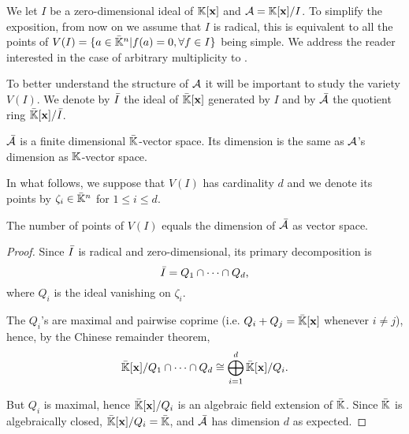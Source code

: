 We let $I$ be a zero-dimensional ideal of $\mathbb{K}[\mathbf{x}]$ and
$\mathcal{A}=\mathbb{K}[\mathbf{x}]/I$.  To simplify the exposition, from now on we
assume that $I$ is radical, this is equivalent to all the points of
$V(I)=\{a\in\bar{\mathbb{K}}^n|f(a)=0, \forall f\in I\}$ being simple. We
address the reader interested in the case of arbitrary multiplicity to
\cite{mourrain+elkadi}.

To better understand the structure of $\mathcal{A}$ it will be important
to study the variety $V(I)$. We denote by $\bar{I}$ the ideal of
$\bar{\mathbb{K}}[\mathbf{x}]$ generated by $I$ and by $\bar{\mathcal{A}}$ the
quotient ring $\bar{\mathbb{K}}[\mathbf{x}]/\bar{I}$.

\begin{lemma}
  $\bar{\mathcal{A}}$ is a finite dimensional $\bar{\mathbb{K}}$-vector
  space. Its dimension is the same as $\mathcal{A}$'s dimension as
  $\mathbb{K}$-vector space.
\end{lemma}

In what follows, we suppose that $V(I)$ has cardinality $d$ and we
denote its points by $\zeta_i\in\bar{\mathbb{K}}^n$ for $1\le i\le d$.

\begin{proposition}
  The number of points of $V(I)$ equals the dimension of
  $\bar{\mathcal{A}}$ as vector space.
\end{proposition}
\begin{proof}
  Since $\bar{I}$ is radical and zero-dimensional, its primary
  decomposition is
  \begin{equation}
    \label{eq:1}
    \bar{I}=Q_1\cap \cdots \cap Q_d
    \text{,}
  \end{equation}
  where $Q_i$ is the ideal vanishing on $\zeta_i$.
  
  The $Q_i$'s are maximal and pairwise coprime
  (i.e. $Q_i+Q_j=\bar{\mathbb{K}}[\mathbf{x}]$ whenever $i\ne j$), hence, by the
  Chinese remainder theorem,
  \begin{equation}
    \label{eq:3}
    \bar{\mathbb{K}}[\mathbf{x}]/Q_1\cap\cdots\cap Q_d \cong \bigoplus_{i=1}^d\bar{\mathbb{K}}[\mathbf{x}]/Q_i
    \text{.}
  \end{equation}

  But $Q_i$ is maximal, hence $\bar{\mathbb{K}}[\mathbf{x}]/Q_i$ is an algebraic
  field extension of $\bar{\mathbb{K}}$. Since $\bar{\mathbb{K}}$ is algebraically
  closed, $\bar{\mathbb{K}}[\mathbf{x}]/Q_i=\bar{\mathbb{K}}$, and $\bar{\mathcal{A}}$ has
  dimension $d$ as expected.
\end{proof}


